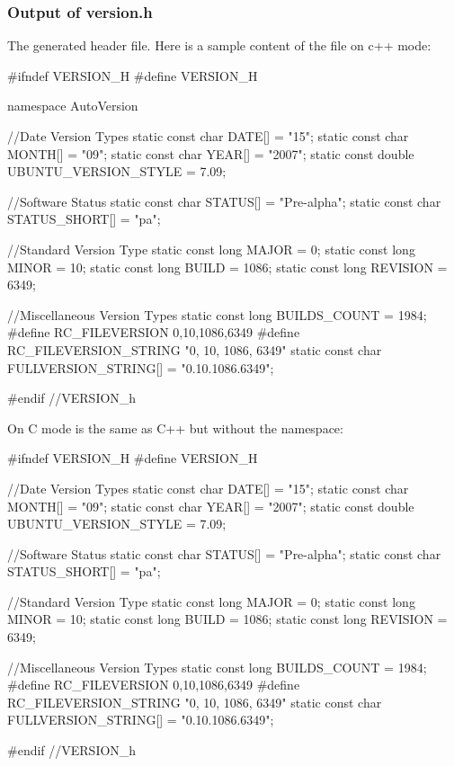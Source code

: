 \subsubsection{Output of version.h}

The generated header file. Here is a sample content of the file on c++ mode:

\begin{code}
#ifndef VERSION_H
#define VERSION_H

namespace AutoVersion{

	//Date Version Types
	static const char DATE[] = "15";
	static const char MONTH[] = "09";
	static const char YEAR[] = "2007";
	static const double UBUNTU_VERSION_STYLE = 7.09;

	//Software Status
	static const char STATUS[] = "Pre-alpha";
	static const char STATUS_SHORT[] = "pa";

	//Standard Version Type
	static const long MAJOR = 0;
	static const long MINOR = 10;
	static const long BUILD = 1086;
	static const long REVISION = 6349;

	//Miscellaneous Version Types
	static const long BUILDS_COUNT = 1984;
	#define RC_FILEVERSION 0,10,1086,6349
	#define RC_FILEVERSION_STRING "0, 10, 1086, 6349\0"
	static const char FULLVERSION_STRING[] = "0.10.1086.6349";

}
#endif //VERSION_h
\end{code}

On C mode is the same as C++ but without the namespace:

\begin{code}
#ifndef VERSION_H
#define VERSION_H

	//Date Version Types
	static const char DATE[] = "15";
	static const char MONTH[] = "09";
	static const char YEAR[] = "2007";
	static const double UBUNTU_VERSION_STYLE = 7.09;

	//Software Status
	static const char STATUS[] = "Pre-alpha";
	static const char STATUS_SHORT[] = "pa";

	//Standard Version Type
	static const long MAJOR = 0;
	static const long MINOR = 10;
	static const long BUILD = 1086;
	static const long REVISION = 6349;

	//Miscellaneous Version Types
	static const long BUILDS_COUNT = 1984;
	#define RC_FILEVERSION 0,10,1086,6349
	#define RC_FILEVERSION_STRING "0, 10, 1086, 6349\0"
	static const char FULLVERSION_STRING[] = "0.10.1086.6349";

#endif //VERSION_h
\end{code}

